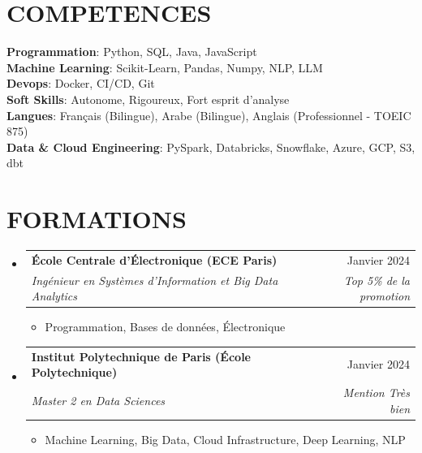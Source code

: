 \documentclass[11pt,a4paper]{article}
\makeatletter
\newcommand{\resumeItem}[1]{
  \item\footnotesize{
    {#1 \vspace{-1pt}}
  }
}
\newcommand{\resumeSubheading}[4]{
  \vspace{2pt}\item
    \begin{tabular*}{\textwidth}[t]{l@{\extracolsep{\fill}}r}
      {\footnotesize\textbf{#1}} & {\footnotesize#2} \\
      {\footnotesize\textit{#3}} & {\footnotesize\textit{#4}} \\
    \end{tabular*}\vspace{2pt}
}
\newcommand{\resumeSubHeadingListStart}{\begin{itemize}[leftmargin=0in, label={}]}
\newcommand{\resumeSubHeadingListEnd}{\end{itemize}}
\newcommand{\resumeItemListStart}{\begin{itemize}[label={\textbullet}]}
\newcommand{\resumeItemListEnd}{\end{itemize}\vspace{0pt}}
\makeatother
\begin{document}
\section{COMPETENCES}
\begin{itemize}[leftmargin=0in, label={}]
\footnotesize{\item{
{\footnotesize\textbf{Programmation}:} {\footnotesize Python, SQL, Java, JavaScript} \\
\vspace{3pt}
{\footnotesize\textbf{Machine Learning}:} {\footnotesize Scikit-Learn, Pandas, Numpy, NLP, LLM} \\
\vspace{3pt}
{\footnotesize\textbf{Devops}:} {\footnotesize Docker, CI/CD, Git} \\
\vspace{3pt}
{\footnotesize\textbf{Soft Skills}:} {\footnotesize Autonome, Rigoureux, Fort esprit d'analyse} \\
\vspace{3pt}
{\footnotesize\textbf{Langues}:} {\footnotesize Français (Bilingue), Arabe (Bilingue), Anglais (Professionnel - TOEIC 875)} \\
\vspace{3pt}
{\footnotesize\textbf{Data \& Cloud Engineering}:} {\footnotesize PySpark, Databricks, Snowflake, Azure, GCP, S3, dbt}
}
}
\end{itemize}

\section{FORMATIONS}
\resumeSubHeadingListStart
    \resumeSubheading
      {École Centrale d'Électronique (ECE Paris)}
      {Janvier 2024}
      {Ingénieur en Systèmes d'Information et Big Data Analytics}
      {Top 5\% de la promotion}
      \resumeItemListStart
        \resumeItem{Programmation, Bases de données, Électronique}
      \resumeItemListEnd
    \resumeSubheading
      {Institut Polytechnique de Paris (École Polytechnique)}
      {Janvier 2024}
      {Master 2 en Data Sciences}
      {Mention Très bien}
      \resumeItemListStart
        \resumeItem{Machine Learning, Big Data, Cloud Infrastructure, Deep Learning, NLP}
      \resumeItemListEnd
  \resumeSubHeadingListEnd
\end{document}
